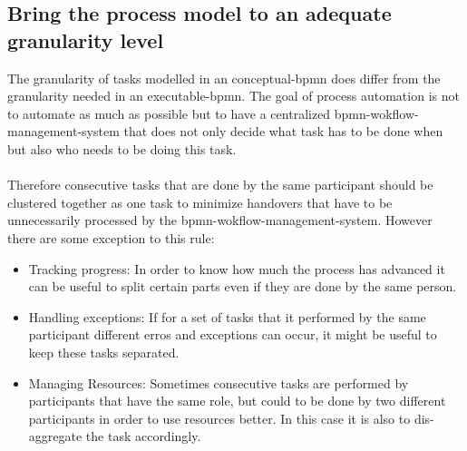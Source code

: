 \subsection{Bring the process model to an adequate granularity level}\label{granulartity}
The granularity of tasks modelled in an \gls{conceptual-bpmn} does differ from the granularity needed in an \gls{executable-bpmn}.
The goal of process automation is not to automate as much as possible but to have a centralized \gls{bpmn-wokflow-management-system} that does not only decide what task has to be done when but also who needs to be doing this task. \cite{freund2019real}
\\~\\Therefore consecutive tasks that are done by the same participant should be clustered together as one task to minimize handovers that have to be unnecessarily processed by the \gls{bpmn-wokflow-management-system}. \cite{fundamentals}
However there are some exception to this rule:
\begin{itemize}
	\item Tracking progress: In order to know how much the process has advanced it can be useful to split certain parts even if they are done by the same person. 
	\item Handling exceptions: If for a set of tasks that it performed by the same participant different erros and exceptions can occur, it might be useful to keep these tasks separated.
	\item Managing Resources: Sometimes consecutive tasks are performed by participants that have the same role, but could to be done by two different participants in order to use resources better. In this case it is also  to dis-aggregate the task accordingly.
 \end{itemize}

